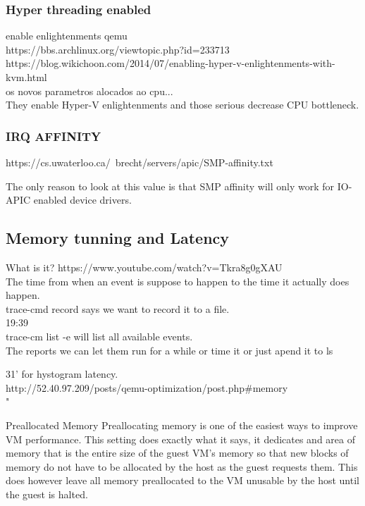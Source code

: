 \documentclass[11pt, a4paper, oneside]{article}
\theoremstyle{definition}
\begin{document}
\subsubsection{Hyper threading enabled}
enable enlightenments qemu\\
https://bbs.archlinux.org/viewtopic.php?id=233713\\
https://blog.wikichoon.com/2014/07/enabling-hyper-v-enlightenments-with-kvm.html\\

os novos parametros alocados ao cpu...\\
They enable Hyper-V enlightenments and those serious decrease CPU bottleneck.

\subsubsection{IRQ AFFINITY}
https://cs.uwaterloo.ca/~brecht/servers/apic/SMP-affinity.txt

The only reason to look at this value is that 
SMP affinity will only work for IO-APIC enabled device drivers.

\subsection{Memory tunning and Latency}
What is it? https://www.youtube.com/watch?v=Tkra8g0gXAU\\
The time from when an event is suppose to happen to the time it actually does happen.\\

trace-cmd record says we want to record it to a file.\\ 
19:39\\
trace-cm list -e will list all available events.\\

The reports we can let them run for a while or time it or just apend it to ls

31' for hystogram latency.\\

http://52.40.97.209/posts/qemu-optimization/post.php$\#$memory\\

"

Preallocated Memory
Preallocating memory is one of the easiest ways to improve VM performance. This setting does exactly what it says, it dedicates and area of memory that is the entire size of the guest VM's memory so that new blocks of memory do not have to be allocated by the host as the guest requests them. This does however leave all memory preallocated to the VM unusable by the host until the guest is halted.\\
\end{document}
